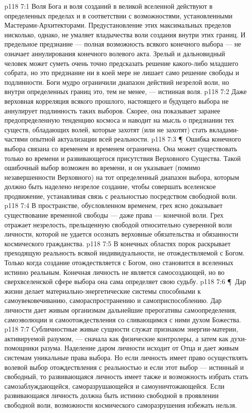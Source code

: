 \vs p118 7:1 Воля Бога и воля созданий в великой вселенной действуют в определенных пределах и в соответствии с возможностями, установленными Мастерами\hyp{}Архитекторами. Предустановление этих максимальных пределов нисколько, однако, не умаляет владычества воли создания внутри этих границ. И предельное предзнание --- полная возможность всякого конечного выбора --- не означает аннулирования конечного волевого акта. Зрелый и дальновидный человек может суметь очень точно предсказать решение какого\hyp{}либо младшего собрата, но это предзнание ни в коей мере не лишает само решение свободы и подлинности. Боги мудро ограничили диапазон действий незрелой воли, но внутри определенных границ это, тем не менее, --- истинная воля.
\vs p118 7:2 Даже верховная корреляция всякого прошлого, настоящего и будущего выбора не аннулирует подлинность таких выборов. Скорее, она показывает заранее предопределенную тенденцию космоса и наводит на мысль о предзнании тех существ, обладающих волей, которые захотят (или не захотят) стать вкладами\hyp{}частями опытной актуализации всей реальности.
\vs p118 7:3 \P\ Ошибка конечного выбора связана со временем и временем ограничена. Она может существовать только во времени и  развивающегося присутствия Верховного Существа. Такой ошибочный выбор возможен во времени, и он указывает (помимо незавершенности Верховного) на тот определенный диапазон выбора, которым должно быть наделено незрелое создание, чтобы совершать вселенское продвижение, устанавливая связь с реальностью посредством свободной воли.
\vs p118 7:4 В пространстве, обусловленном временем, грех ясно доказывает существование временной свободы --- даже права --- конечной воли. Грех отражает незрелость, прельщенную свободой относительно суверенной воли личности, которой не удается осознать верховные обязательства и обязанности космического гражданства.
\vs p118 7:5 В конечных областях порок раскрывает преходящую реальность всякой индивидуальности, не отождествляемой с Богом. Только когда создание отождествляется с Богом, оно становится в вселенных истинно реальным. Конечная личность не является самосоздающей, но во сверхвселенской сфере выбора она сама определяет свою судьбу.
\vs p118 7:6 \P\ Дар жизни делает материально\hyp{}энергетические системы способными к самоувековечиванию, самораспространению и самоприспособлению. Дар личности дает живым организмам дальнейшие прерогативы самоопределения, самоэволюции и самоотождествления со сливающимся с ними духом Божества.
\vs p118 7:7 Субличностные живые сущности служат признаком энергии\hyp{}материи, активируемой разумом, --- сначала как физические контролеры, а затем как духи\hyp{}помощники разума. Наделение даром личности исходит от Отца и дает живым системам уникальные права выбора. Но если личность имеет право осуществлять волевой выбор отождествления с реальностью и если этот выбор --- истинный и свободный, то развивающаяся личность имеет также и возможность избрать стать самозаблуждающейся, саморазрушающейся и самоуничтожающейся. Если развивающаяся личность должна быть истинно свободной в проявлении свободной воли, возможности космического саморазрушения избежать нельзя.
